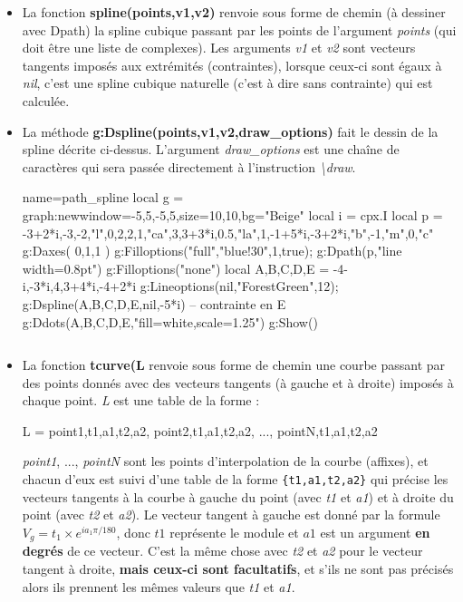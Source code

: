 \documentclass[%
10pt,%
a4paper,%
french,%
]%
{article}%
\newenvironment*{demo}[2][]{%
\gdef\legende{#2}%
\gdef\lab{#1}%
\bgroup
\VerbatimOut{\jobname.tmp}%
}%
{%
\endVerbatimOut%
\egroup%
\inputminted[ignorelexererrors=true,breaklines,bgcolor=Beige,linenos,numbersep=6pt,frame=single,fontsize=\footnotesize]{Lua}{\jobname.tmp}%
\begin{minipage}{0.9\textwidth}
\begin{center}
\captionof{figure}{\legende}\label{\lab}%
%
\end{center}
\end{minipage}
}
\begin{document}
\begin{itemize}
\item La fonction \textbf{spline(points,v1,v2)} renvoie sous forme de chemin (à dessiner avec Dpath) la spline cubique passant par les points de l'argument \emph{points} (qui doit être une liste de complexes). Les arguments \emph{v1} et \emph{v2} sont vecteurs tangents imposés aux extrémités (contraintes), lorsque ceux-ci sont égaux à \emph{nil}, c'est une spline cubique naturelle (c'est à dire sans contrainte) qui est calculée.

\item La méthode \textbf{g:Dspline(points,v1,v2,draw\_options)} fait le dessin de la spline décrite ci-dessus. L'argument \emph{draw\_options} est une chaîne de caractères qui sera passée directement à l'instruction \emph{\textbackslash draw}.

\begin{demo}{Path et Spline}
\begin{luadraw}{name=path_spline}
local g = graph:new{window={-5,5,-5,5},size={10,10},bg="Beige"}
local i = cpx.I
local p = {-3+2*i,-3,-2,"l",0,2,2,1,"ca",3,3+3*i,0.5,"la",1,-1+5*i,-3+2*i,"b",-1,"m",0,"c"}
g:Daxes( {0,1,1} )
g:Filloptions("full","blue!30",1,true); g:Dpath(p,"line width=0.8pt")
g:Filloptions("none")
local A,B,C,D,E = -4-i,-3*i,4,3+4*i,-4+2*i
g:Lineoptions(nil,"ForestGreen",12); g:Dspline({A,B,C,D,E},nil,-5*i) -- contrainte en E
g:Ddots({A,B,C,D,E},"fill=white,scale=1.25")
g:Show()
\end{luadraw}
\end{demo}

\item La fonction \textbf{tcurve(L} renvoie sous forme de chemin une courbe passant par des points donnés avec des vecteurs tangents (à gauche et à droite) imposés à chaque point. \emph{L} est une table de la forme :
\begin{Luacode}
L = {point1,{t1,a1,t2,a2}, point2,{t1,a1,t2,a2}, ..., pointN,{t1,a1,t2,a2}}
\end{Luacode}
\emph{point1}, ..., \emph{pointN} sont les points d'interpolation de la courbe (affixes), et chacun d'eux est suivi d'une table de la forme \verb|{t1,a1,t2,a2}| qui précise les vecteurs tangents à la courbe à gauche du point (avec \emph{t1} et \emph{a1}) et à droite du point (avec \emph{t2} et \emph{a2}). Le vecteur tangent à gauche est donné par la formule $V_g = t_1\times e^{ia_1\pi/180}$, donc $t1$ représente le module et $a1$ est un argument \textbf{en degrés} de ce vecteur. C'est la même chose avec \emph{t2} et \emph{a2} pour le vecteur tangent à droite, \textbf{mais ceux-ci sont facultatifs}, et s'ils ne sont pas précisés alors ils prennent les mêmes valeurs que \emph{t1} et \emph{a1}.


\end{itemize}
\end{document}
